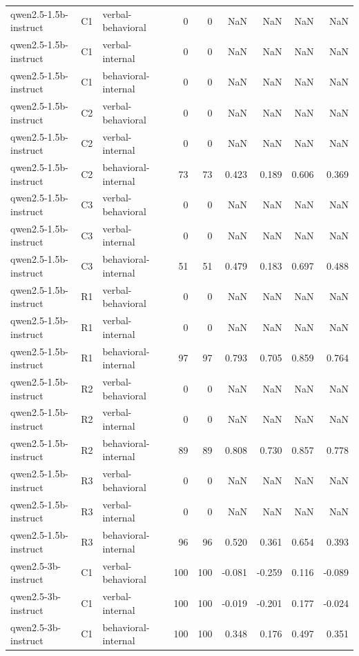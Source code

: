 \begin{table}
\begin{tabular}{lllrrrrrr}
qwen2.5-1.5b-instruct & C1 & verbal-behavioral & 0 & 0 & NaN & NaN & NaN & NaN \\
qwen2.5-1.5b-instruct & C1 & verbal-internal & 0 & 0 & NaN & NaN & NaN & NaN \\
qwen2.5-1.5b-instruct & C1 & behavioral-internal & 0 & 0 & NaN & NaN & NaN & NaN \\
qwen2.5-1.5b-instruct & C2 & verbal-behavioral & 0 & 0 & NaN & NaN & NaN & NaN \\
qwen2.5-1.5b-instruct & C2 & verbal-internal & 0 & 0 & NaN & NaN & NaN & NaN \\
qwen2.5-1.5b-instruct & C2 & behavioral-internal & 73 & 73 & 0.423 & 0.189 & 0.606 & 0.369 \\
qwen2.5-1.5b-instruct & C3 & verbal-behavioral & 0 & 0 & NaN & NaN & NaN & NaN \\
qwen2.5-1.5b-instruct & C3 & verbal-internal & 0 & 0 & NaN & NaN & NaN & NaN \\
qwen2.5-1.5b-instruct & C3 & behavioral-internal & 51 & 51 & 0.479 & 0.183 & 0.697 & 0.488 \\
qwen2.5-1.5b-instruct & R1 & verbal-behavioral & 0 & 0 & NaN & NaN & NaN & NaN \\
qwen2.5-1.5b-instruct & R1 & verbal-internal & 0 & 0 & NaN & NaN & NaN & NaN \\
qwen2.5-1.5b-instruct & R1 & behavioral-internal & 97 & 97 & 0.793 & 0.705 & 0.859 & 0.764 \\
qwen2.5-1.5b-instruct & R2 & verbal-behavioral & 0 & 0 & NaN & NaN & NaN & NaN \\
qwen2.5-1.5b-instruct & R2 & verbal-internal & 0 & 0 & NaN & NaN & NaN & NaN \\
qwen2.5-1.5b-instruct & R2 & behavioral-internal & 89 & 89 & 0.808 & 0.730 & 0.857 & 0.778 \\
qwen2.5-1.5b-instruct & R3 & verbal-behavioral & 0 & 0 & NaN & NaN & NaN & NaN \\
qwen2.5-1.5b-instruct & R3 & verbal-internal & 0 & 0 & NaN & NaN & NaN & NaN \\
qwen2.5-1.5b-instruct & R3 & behavioral-internal & 96 & 96 & 0.520 & 0.361 & 0.654 & 0.393 \\
qwen2.5-3b-instruct & C1 & verbal-behavioral & 100 & 100 & -0.081 & -0.259 & 0.116 & -0.089 \\
qwen2.5-3b-instruct & C1 & verbal-internal & 100 & 100 & -0.019 & -0.201 & 0.177 & -0.024 \\
qwen2.5-3b-instruct & C1 & behavioral-internal & 100 & 100 & 0.348 & 0.176 & 0.497 & 0.351 \\

\end{tabular}
\end{table}
